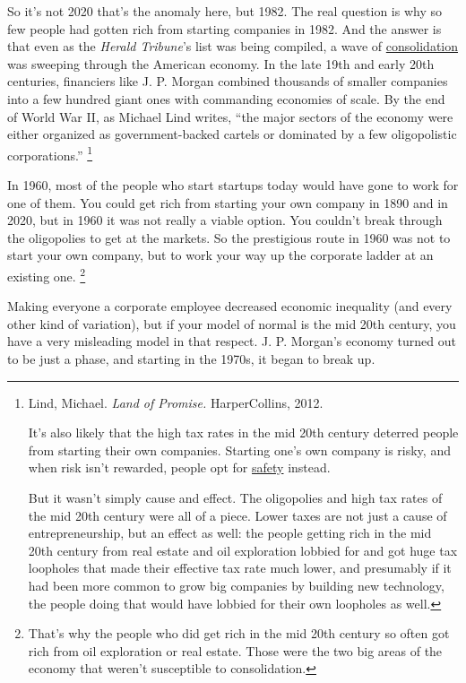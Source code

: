 So it's not 2020 that's the anomaly here, but 1982. The real question is
why so few people had gotten rich from starting companies in 1982. And
the answer is that even as the \emph{Herald Tribune}'s list was being
compiled, a wave of \href{re.html}{consolidation} was sweeping through
the American economy. In the late 19th and early 20th centuries,
financiers like J. P. Morgan combined thousands of smaller companies
into a few hundred giant ones with commanding economies of scale. By the
end of World War II, as Michael Lind writes, ``the major sectors of the
economy were either organized as government-backed cartels or dominated
by a few oligopolistic corporations.'' \footnote{Lind, Michael. \emph{Land of Promise.} HarperCollins, 2012.

It's also likely that the high tax rates in the mid 20th century
deterred people from starting their own companies. Starting one's own
company is risky, and when risk isn't rewarded, people opt for
\href{inequality.html}{safety} instead.

But it wasn't simply cause and effect. The oligopolies and high tax
rates of the mid 20th century were all of a piece. Lower taxes are not
just a cause of entrepreneurship, but an effect as well: the people
getting rich in the mid 20th century from real estate and oil
exploration lobbied for and got huge tax loopholes that made their
effective tax rate much lower, and presumably if it had been more common
to grow big companies by building new technology, the people doing that
would have lobbied for their own loopholes as well.}

In 1960, most of the people who start startups today would have gone to
work for one of them. You could get rich from starting your own company
in 1890 and in 2020, but in 1960 it was not really a viable option. You
couldn't break through the oligopolies to get at the markets. So the
prestigious route in 1960 was not to start your own company, but to work
your way up the corporate ladder at an existing one.
\footnote{That's why the people who did get rich in the mid 20th century
so often got rich from oil exploration or real estate. Those were the
two big areas of the economy that weren't susceptible to consolidation.}

Making everyone a corporate employee decreased economic inequality (and
every other kind of variation), but if your model of normal is the mid
20th century, you have a very misleading model in that respect. J. P.
Morgan's economy turned out to be just a phase, and starting in the
1970s, it began to break up.

